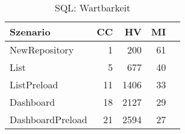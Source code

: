 \begin{table}[ht]
\centering
\caption{SQL: Wartbarkeit}
\begin{tabular}{lrrrr}
\toprule
Szenario & CC & HV & MI \\
\midrule
	NewRepository & 1 & 200 & 61 \\
	List & 5 & 677 & 40 \\
	ListPreload & 11 & 1406 & 33 \\
	Dashboard & 18 & 2127 & 29 \\
	DashboardPreload & 21 & 2594 & 27 \\
\bottomrule
\end{tabular}
\label{tab:sql_maintainability}
\end{table}
	
